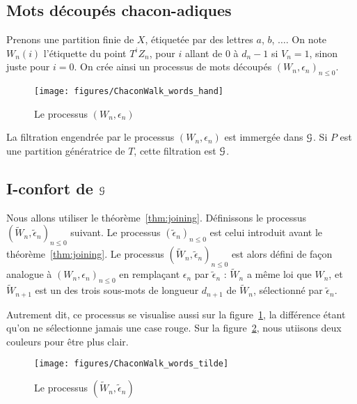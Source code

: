 \documentclass[12pt,a4paper]{article}
\begin{document}
\subsection{Mots découpés chacon-adiques}

Prenons une partition finie de $X$, étiquetée par des lettres $a$, $b$, $\ldots$.  
On note $W_n(i)$ l'étiquette du point $T^iZ_n$, pour $i$ allant de 
$0$ à $d_n-1$ si $V_n=1$, sinon juste pour $i=0$. 
On crée ainsi un processus de mots découpés ${(W_n, \epsilon_n)}_{n \leq 0}$. 

\begin{figure}[!h]
\centering
	\texttt{[image: figures/ChaconWalk\_words\_hand]}
\caption{Le processus $(W_n, \epsilon_n)$}\label{fig:Wn}
\end{figure}

La filtration engendrée par le processus $(W_n, \epsilon_n)$ est immergée dans 
$\EuScript{G}$. 
Si $P$ est une partition génératrice de $T$, cette filtration est 
 $\EuScript{G}$.  


\subsection{I-confort de $\EuScript{G}$}


Nous allons utiliser le théorème~\ref{thm:joining}. 
Définissons le processus  ${(\widetilde{W}_n, \widetilde{\epsilon}_n)}_{n \leq 0}$ suivant. 
Le processus ${(\widetilde{\epsilon}_n)}_{n \leq 0}$ est celui introduit 
avant le théorème~\ref{thm:joining}. 
Le processus  ${(\widetilde{W}_n, \widetilde{\epsilon}_n)}_{n \leq 0}$ 
est alors défini de façon analogue à ${(W_n, \epsilon_n)}_{n \leq 0}$ 
en remplaçant $\epsilon_n$ par $\widetilde{\epsilon}_n$ : 
$\widetilde{W}_n$ a même loi que $W_n$, et $\widetilde{W}_{n+1}$ est un 
des trois sous-mots de longueur $d_{n+1}$ de $\widetilde{W}_n$, sélectionné par 
$\widetilde{\epsilon}_n$. 

Autrement dit, ce processus se visualise aussi sur la figure~\ref{fig:Wn}, 
la différence étant qu'on ne sélectionne jamais une case rouge. 
Sur la figure~\ref{fig:tildeWn}, nous utiisons deux couleurs pour être plus clair.


\begin{figure}[!h]
\centering
	\texttt{[image: figures/ChaconWalk\_words\_tilde]}
\caption{Le processus $(\widetilde{W}_n, \widetilde{\epsilon}_n)$}\label{fig:tildeWn}
\end{figure}
\end{document}
